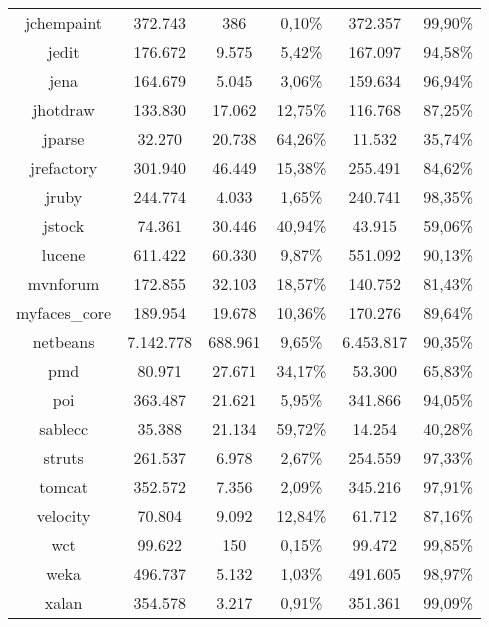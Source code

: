 \begin{table}
\begin{tabularx}{\textwidth}{c|c|c|c|c|c}
		jchempaint & 372.743 & 386 & 0,10\% & 372.357 & 99,90\% \\
		jedit & 176.672 & 9.575 & 5,42\% & 167.097 & 94,58\% \\
		jena & 164.679 & 5.045 & 3,06\% & 159.634 & 96,94\% \\
		jhotdraw & 133.830 & 17.062 & 12,75\% & 116.768 & 87,25\% \\
		jparse & 32.270 & 20.738 & 64,26\% & 11.532 & 35,74\% \\
		jrefactory & 301.940 & 46.449 & 15,38\% & 255.491 & 84,62\% \\
		jruby & 244.774 & 4.033 & 1,65\% & 240.741 & 98,35\% \\
		jstock & 74.361 & 30.446 & 40,94\% & 43.915 & 59,06\% \\
		lucene & 611.422 & 60.330 & 9,87\% & 551.092 & 90,13\% \\
		mvnforum & 172.855 & 32.103 & 18,57\% & 140.752 & 81,43\% \\
		myfaces\_core & 189.954 & 19.678 & 10,36\% & 170.276 & 89,64\% \\
		netbeans & 7.142.778 & 688.961 & 9,65\% & 6.453.817 & 90,35\% \\
		pmd & 80.971 & 27.671 & 34,17\% & 53.300 & 65,83\% \\
		poi & 363.487 & 21.621 & 5,95\% & 341.866 & 94,05\% \\
		sablecc & 35.388 & 21.134 & 59,72\% & 14.254 & 40,28\% \\
		struts & 261.537 & 6.978 & 2,67\% & 254.559 & 97,33\% \\
		tomcat & 352.572 & 7.356 & 2,09\% & 345.216 & 97,91\% \\
		velocity & 70.804 & 9.092 & 12,84\% & 61.712 & 87,16\% \\
		wct & 99.622 & 150 & 0,15\% & 99.472 & 99,85\% \\
		weka & 496.737 & 5.132 & 1,03\% & 491.605 & 98,97\% \\
		xalan & 354.578 & 3.217 & 0,91\% & 351.361 & 99,09\% \\
	\end{tabularx}
\end{table}
\setlength{\extrarowheight}{0em}